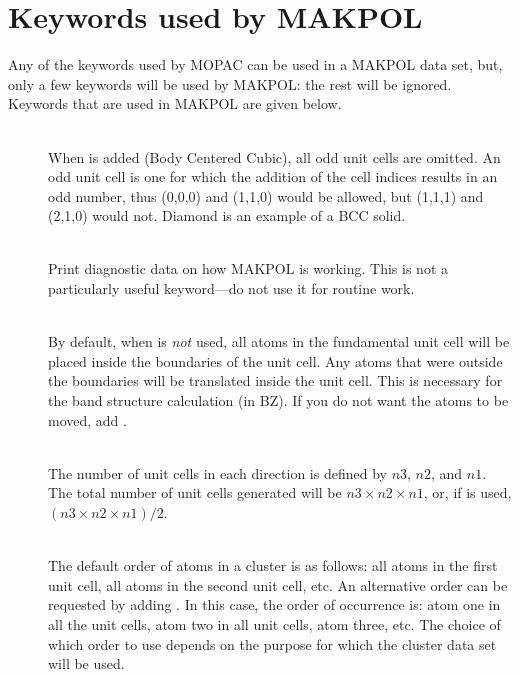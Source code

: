 \section{Keywords used by MAKPOL}
Any of the keywords used by MOPAC can be used in a MAKPOL data set, but, only a
few keywords will be used by MAKPOL: the rest will be ignored.  Keywords that
are used in  MAKPOL are given below.

\begin{description}
\item[]~\\
When  is added (Body Centered Cubic), all odd unit cells are omitted.
An odd unit cell is one for which the addition of the cell indices results in
an odd number, thus (0,0,0) and (1,1,0) would be allowed, but (1,1,1) and
(2,1,0) would not.  Diamond is an example of a BCC solid.\label{makpol:bcc}

\item[]~\\
Print diagnostic data on how MAKPOL is working. This is not a particularly
useful keyword---do not use it for routine work. 

\item[]~\\ 
By default, when  is {\em not} used, all atoms in the fundamental
unit cell will be placed inside  the boundaries of the unit cell.  Any atoms
that were outside the boundaries will  be translated inside the unit cell. 
This is necessary for the band structure calculation (in BZ). If you do not
want the atoms to be moved, add .


\item[]~\\
The number of unit cells in each  direction is defined by $n3$, $n2$,  and
$n1$.  The total number of unit cells generated will be $n3\times n2\times n1$,
or, if  is used,  $(n3\times n2\times n1)/2$.

\item[]~\\
The default order of atoms in a cluster is as follows: all atoms in the first
unit cell, all atoms in the second unit cell, etc.  An alternative order can be
requested by adding .  In this case, the order of occurrence is:
atom one in all the unit cells, atom two in all unit cells, atom three, etc. 
The choice of which order to use depends on the purpose for which the cluster
data set will be used.


\end{description}
